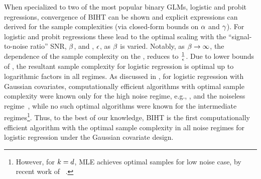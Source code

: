 %
When specialized to two of the most popular binary GLMs, logistic and probit regressions, convergence of BIHT can be shown and explicit expressions
can derived for the sample complexities (via closed-form bounds on \(  \alpha  \) and \(  \gamma  \)).
For logistic and probit regressions these
lead to
the optimal scaling with the ``signal-to-noise ratio'' SNR, \(  \beta  \), and \errorrate, \(  \epsilon  \), as \(  \beta  \) is varied.
Notably, as \(  \beta \to \infty  \), the dependence of the sample complexity on the \errorrate, reduces to \(  \frac{1}{\epsilon}  \).
Due to lower bounds of \cite{hsu2024sample},
the resultant sample complexity for logistic regression is optimal up to logarithmic factors in all %
regimes.
As discussed in \cite{hsu2024sample}, for logistic regression with Gaussian covariates,  computationally efficient algorithms  with optimal sample complexity were known only for the high noise regime, %
e.g., \cite{plan2017high}, and %
the noiseless regime~\cite{matsumoto2022binary}, while no such optimal algorithms were known for the intermediate regimes\footnote{However, for $k=d$, MLE achieves optimal samples for low noise case, by recent work of~ \cite{chardon2024finite}.}.
Thus, to the best of our knowledge, BIHT is the first computationally efficient algorithm with the optimal sample complexity in all noise regimes
for logistic regression under the Gaussian covariate design.

